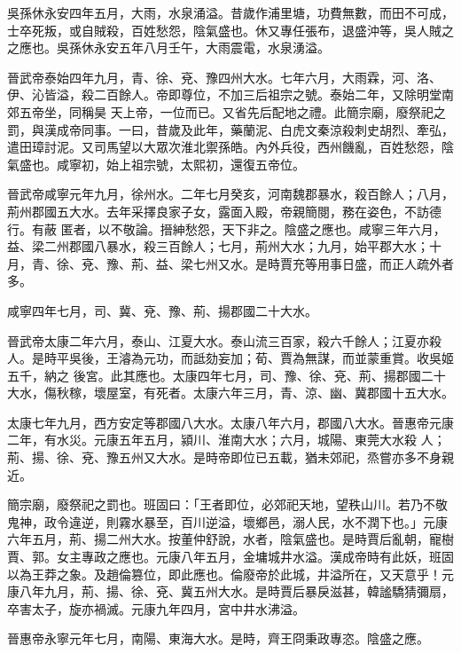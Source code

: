 \begin{pinyinscope}
 吳孫休永安四年五月，大雨，水泉涌溢。昔歲作浦里塘，功費無數，而田不可成，士卒死叛，或自賊殺，百姓愁怨，陰氣盛也。休又專任張布，退盛沖等，吳人賊之之應也。吳孫休永安五年八月壬午，大雨震電，水泉湧溢。



 晉武帝泰始四年九月，青、徐、兗、豫四州大水。七年六月，大雨霖，河、洛、伊、沁皆溢，殺二百餘人。帝即尊位，不加三后祖宗之號。泰始二年，又除明堂南郊五帝坐，同稱昊
 天上帝，一位而已。又省先后配地之禮。此簡宗廟，廢祭祀之罰，與漢成帝同事。一曰，昔歲及此年，藥蘭泥、白虎文秦涼殺刺史胡烈、牽弘，遣田璋討泥。又司馬望以大眾次淮北禦孫皓。內外兵役，西州饑亂，百姓愁怨，陰氣盛也。咸寧初，始上祖宗號，太熙初，還復五帝位。



 晉武帝咸寧元年九月，徐州水。二年七月癸亥，河南魏郡暴水，殺百餘人；八月，荊州郡國五大水。去年采擇良家子女，露面入殿，帝親簡閱，務在姿色，不訪德行。有蔽
 匿者，以不敬論。搢紳愁怨，天下非之。陰盛之應也。咸寧三年六月，益、梁二州郡國八暴水，殺三百餘人；七月，荊州大水；九月，始平郡大水；十月，青、徐、兗、豫、荊、益、梁七州又水。是時賈充等用事日盛，而正人疏外者多。



 咸寧四年七月，司、冀、兗、豫、荊、揚郡國二十大水。



 晉武帝太康二年六月，泰山、江夏大水。泰山流三百家，殺六千餘人；江夏亦殺人。是時平吳後，王濬為元功，而詆劾妄加；荀、賈為無謀，而並蒙重賞。收吳姬五千，納之
 後宮。此其應也。太康四年七月，司、豫、徐、兗、荊、揚郡國二十大水，傷秋稼，壞屋室，有死者。太康六年三月，青、涼、幽、冀郡國十五大水。



 太康七年九月，西方安定等郡國八大水。太康八年六月，郡國八大水。晉惠帝元康二年，有水災。元康五年五月，潁川、淮南大水；六月，城陽、東莞大水殺
 人；荊、揚、徐、兗、豫五州又大水。是時帝即位已五載，猶未郊祀，烝嘗亦多不身親近。



 簡宗廟，廢祭祀之罰也。班固曰：「王者即位，必郊祀天地，望秩山川。若乃不敬鬼神，政令違逆，則霧水暴至，百川逆溢，壞鄉邑，溺人民，水不潤下也。」元康六年五月，荊、揚二州大水。按董仲舒說，水者，陰氣盛也。是時賈后亂朝，寵樹賈、郭。女主專政之應也。元康八年五月，金墉城井水溢。漢成帝時有此妖，班固
 以為王莽之象。及趙倫篡位，即此應也。倫廢帝於此城，井溢所在，又天意乎！元康八年九月，荊、揚、徐、兗、冀五州大水。是時賈后暴戾滋甚，韓謐驕猜彌扇，卒害太子，旋亦禍滅。元康九年四月，宮中井水沸溢。



 晉惠帝永寧元年七月，南陽、東海大水。是時，齊王冏秉政專恣。陰盛之應。




\end{pinyinscope}
